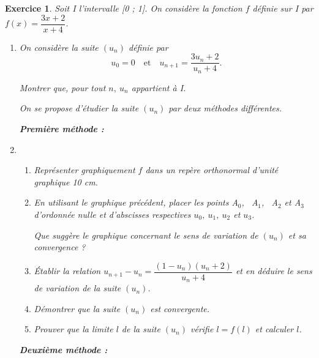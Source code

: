 \documentclass[12pt,a4paper,french]{article}
\theoremstyle{break}
\newtheorem{exercice}{Exercice}
\theoremstyle{nonumberplain}
\theoremstyle{nonumberbreak}
\begin{document}
\begin{exercice}

  Soit I l'intervalle [0 ; 1]. On considère la fonction $f$ définie sur
  I par $f(x) = \dfrac{3x +2}{x+4}$.

  \begin{enumerate}  les variations de $f$ et en déduire
        que, pour tout $x$ élément de I, $f(x)$ appartient à I.
    \item On considère la suite $\left(u_{n}\right)$ définie par
      \[u_{0} = 0\quad  \text{et} \quad u_{n +1} =
      \dfrac{3u_{n}+2}{u_{n} + 4}.\]

      Montrer que, pour tout $n,~ u_{n}$ appartient à I.

      On se propose d'étudier la suite $\left(u_{n}\right)$ par deux
      méthodes différentes.
      \vspace{0,8cm}

      \textbf{Première méthode :}

    \item \begin{enumerate} \item Représenter graphiquement $f$ dans un
          repère orthonormal d'unité graphique 10 cm.

        \item En utilisant le graphique précédent, placer les points
          A$_{0}$,~ A$_{1}$,~ A$_{2}$ et A$_{3}$ d'ordonnée nulle et
          d'abscisses respectives $u_{0},~ u_{1},~ u_{2}$ et $u_{3}$.

          Que suggère le graphique concernant le sens de variation de
          $\left(u_{n}\right)$ et sa convergence ?

        \item Établir la relation $u_{n+1} - u_{n} = \dfrac{\left(1 -
          u_{n}\right)\left(u_{n}+2\right)}{u_{n }+ 4}$ et en déduire le
          sens de variation de la suite $\left(u_{n}\right)$.

        \item Démontrer que la suite $\left(u_{n}\right)$ est
          convergente.

        \item Prouver que la limite $l$ de la suite $\left(u_{n}\right)$
          vérifie $l = f(l)$ et calculer $l$.

      \end{enumerate}
      \vspace{0,8cm}

      \textbf{Deuxième méthode :}


\end{enumerate}
\end{exercice}
\end{document}
